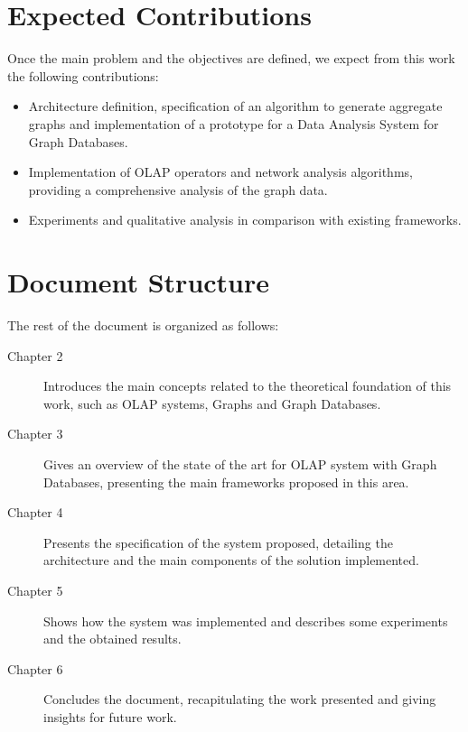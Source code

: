 \section{Expected Contributions}
Once the main problem and the objectives are defined, we expect from this work the following contributions:

\begin{itemize}
\item Architecture definition, specification of an algorithm to generate aggregate graphs and implementation of a prototype for a Data Analysis System for Graph Databases.
\item Implementation of OLAP operators and network analysis algorithms, providing a comprehensive analysis of the graph data.
\item Experiments and qualitative analysis in comparison with existing frameworks.
\end{itemize}


\section{Document Structure}
The rest of the document is organized as follows:
\begin{description}
\item[Chapter 2] Introduces the main concepts related to the theoretical foundation of this work, such as OLAP systems, Graphs and Graph Databases.
\item[Chapter 3] Gives an overview of the state of the art for OLAP system with Graph Databases, presenting the main frameworks proposed in this area.
\item[Chapter 4] Presents the specification of the system proposed, detailing the architecture and the main components of the solution implemented.
\item[Chapter 5] Shows how the system was implemented and describes some experiments and the obtained results.
\item[Chapter 6] Concludes the document, recapitulating the work presented and giving insights for future work.
\end{description}
